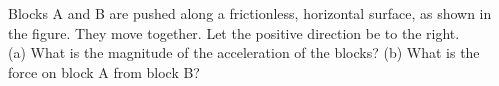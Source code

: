 Blocks A and B are pushed along a frictionless, horizontal
surface, as shown in the figure. They move together. Let the positive direction be to the right.\\
%
(a) What is the magnitude of the acceleration of the blocks?\answercheck\hwendpart
%
(b) What is the force on block A from block B?\answercheck
